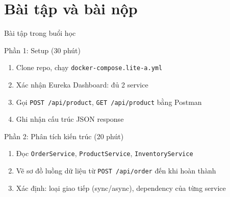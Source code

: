 \documentclass[aspectratio=169,12pt]{beamer}
\begin{document}
\section{Bài tập và bài nộp}

\begin{frame}[shrink=8]{Bài tập trong buổi học}
  \begin{block}{Phần 1: Setup (30 phút)}
    \begin{enumerate}
      \item Clone repo, chạy \texttt{docker-compose.lite-a.yml}
      \item Xác nhận Eureka Dashboard: đủ 2 service
      \item Gọi \texttt{POST /api/product}, \texttt{GET /api/product} bằng Postman
      \item Ghi nhận cấu trúc JSON response
    \end{enumerate}
  \end{block}

  \begin{block}{Phần 2: Phân tích kiến trúc (20 phút)}
    \begin{enumerate}
      \item Đọc \texttt{OrderService}, \texttt{ProductService}, \texttt{InventoryService}
      \item Vẽ sơ đồ luồng dữ liệu từ \texttt{POST /api/order} đến khi hoàn thành
      \item Xác định: loại giao tiếp (sync/async), dependency của từng service
    \end{enumerate}
  \end{block}
\end{frame}
\end{document}
